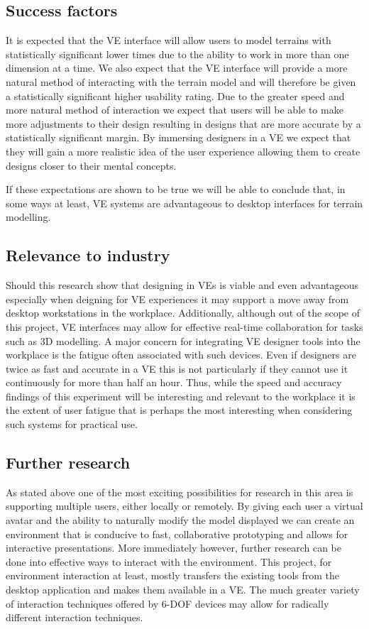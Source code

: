 \documentclass{sig-alternate-05-2015}
\begin{document}
\subsection{Success factors}
It is expected that the VE interface will allow users to model terrains with statistically significant lower times due to the ability to work in more than one dimension at a time. We also expect that the VE interface will provide a more natural method of interacting with the terrain model and will therefore be given a statistically significant higher usability rating. Due to the greater speed and more natural method of interaction we expect that users will be able to make more adjustments to their design resulting in designs that are more accurate by a statistically significant margin. By immersing designers in a VE we expect that they will gain a more realistic idea of the user experience allowing them to create designs closer to their mental concepts.

If these expectations are shown to be true we will be able to conclude that, in some ways at least, VE systems are advantageous to desktop interfaces for terrain modelling. 
\subsection{Relevance to industry}
Should this research show that designing in VEs is viable and even advantageous especially when deigning for VE experiences it may support a move away from desktop workstations in the workplace. Additionally, although out of the scope of this project, VE interfaces may allow for effective real-time collaboration for tasks such as 3D modelling. A major concern for integrating VE designer tools into the workplace is the fatigue often associated with such devices. Even if designers are twice as fast and accurate in a VE this is not particularly if they cannot use it continuously for more than half an hour. Thus, while the speed and accuracy findings of this experiment will be interesting and relevant to the workplace it is the extent of user fatigue that is perhaps the most interesting when considering such systems for practical use.
\subsection{Further research}
As stated above one of the most exciting possibilities for research in this area is supporting multiple users, either locally or remotely. By giving each user a virtual avatar and the ability to naturally modify the model displayed we can create an environment that is conducive to fast, collaborative prototyping and allows for interactive presentations.
More immediately however, further research can be done into effective ways to interact with the environment. This project, for environment interaction at least, mostly transfers the existing tools from the desktop application and makes them available in a VE. The much greater variety of interaction techniques offered by 6-DOF devices may allow for radically different interaction techniques.


\end{document}
